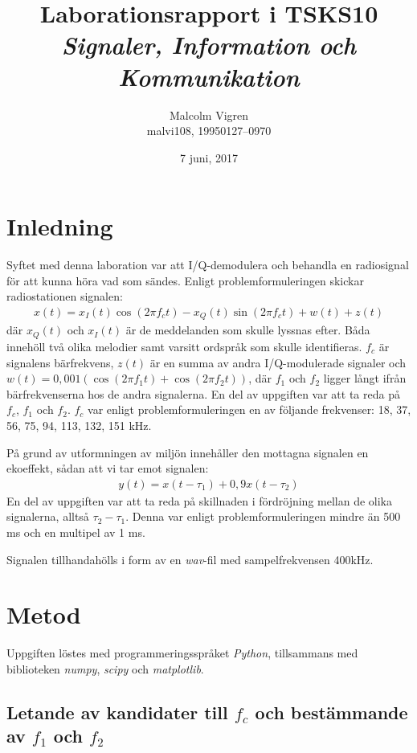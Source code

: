 \documentclass[10pt,twocolumn]{article}
\title{Laborationsrapport i TSKS10 \emph{Signaler, Information och Kommunikation}}
\author{Malcolm Vigren \\ malvi108, 19950127--0970 }
\date{7 juni, 2017}
\begin{document}
\maketitle

\section{Inledning}

Syftet med denna laboration var att I/Q-demodulera och behandla en radiosignal
för att kunna höra vad som sändes. Enligt problemformuleringen skickar
radiostationen signalen:
\begin{align*}
    x(t) = x_I(t)\cos(2 \pi f_c t) - x_Q(t)\sin(2 \pi f_c t) + w(t) + z(t)
\end{align*}
där $x_Q(t)$ och $x_I(t)$ är de meddelanden som skulle lyssnas efter. 
Båda innehöll två olika melodier samt varsitt ordspråk som skulle identifieras.
$f_c$ är signalens bärfrekvens, $z(t)$ är en summa av andra I/Q-modulerade
signaler och $w(t) = 0,001(\cos(2 \pi f_1 t) + \cos(2 \pi f_2 t))$, där $f_1$ och
$f_2$ ligger långt ifrån bärfrekvenserna hos de andra signalerna. En del av
uppgiften var att ta reda på $f_c$, $f_1$ och $f_2$. $f_c$ var enligt
problemformuleringen en av följande frekvenser: 18, 37, 56, 75, 94, 113,
132, 151 kHz.

På grund av utformningen av miljön innehåller den mottagna signalen en
ekoeffekt, sådan att vi tar emot signalen:
\begin{align*}
    y(t) = x(t - \tau_1) + 0,9x(t - \tau_2)
\end{align*}
En del av uppgiften var att ta reda på skillnaden i fördröjning mellan 
de olika signalerna,
alltså $\tau_2 - \tau_1$. Denna var enligt problemformuleringen mindre än 500 ms
och en multipel av 1 ms.

Signalen tillhandahölls i form av en \textit{wav}-fil med sampelfrekvensen 400kHz.

\section{Metod}

Uppgiften löstes med programmeringsspråket \textit{Python}, tillsammans med
biblioteken \textit{numpy}, \textit{scipy} och \textit{matplotlib}.

\subsection{Letande av kandidater till $f_c$ och bestämmande av $f_1$ och
$f_2$}\label{sub:candidates}
\end{document}
